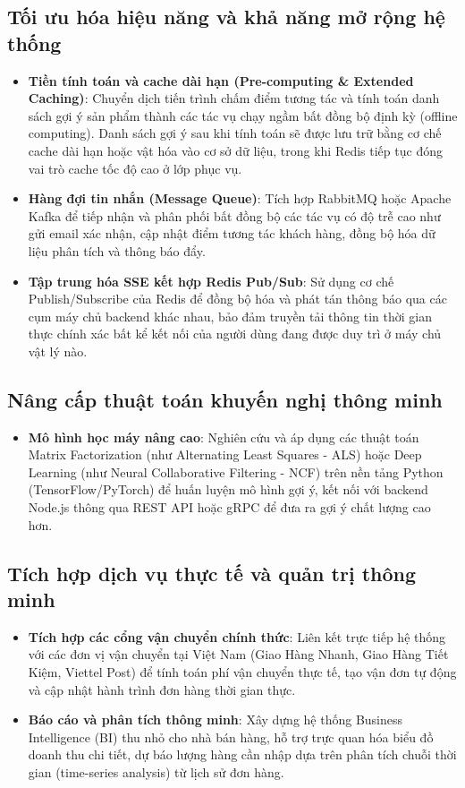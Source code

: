 \documentclass[../DoAn.tex]{subfiles}
\begin{document}
\subsection{Tối ưu hóa hiệu năng và khả năng mở rộng hệ thống}
\begin{itemize}
    \item \textbf{Tiền tính toán và cache dài hạn (Pre-computing \& Extended Caching)}: Chuyển dịch tiến trình chấm điểm tương tác và tính toán danh sách gợi ý sản phẩm thành các tác vụ chạy ngầm bất đồng bộ định kỳ (offline computing). Danh sách gợi ý sau khi tính toán sẽ được lưu trữ bằng cơ chế cache dài hạn hoặc vật hóa vào cơ sở dữ liệu, trong khi Redis tiếp tục đóng vai trò cache tốc độ cao ở lớp phục vụ.
    \item \textbf{Hàng đợi tin nhắn (Message Queue)}: Tích hợp RabbitMQ hoặc Apache Kafka để tiếp nhận và phân phối bất đồng bộ các tác vụ có độ trễ cao như gửi email xác nhận, cập nhật điểm tương tác khách hàng, đồng bộ hóa dữ liệu phân tích và thông báo đẩy.
    \item \textbf{Tập trung hóa SSE kết hợp Redis Pub/Sub}: Sử dụng cơ chế Publish/Subscribe của Redis để đồng bộ hóa và phát tán thông báo qua các cụm máy chủ backend khác nhau, bảo đảm truyền tải thông tin thời gian thực chính xác bất kể kết nối của người dùng đang được duy trì ở máy chủ vật lý nào.
\end{itemize}

\subsection{Nâng cấp thuật toán khuyến nghị thông minh}
\begin{itemize}
    \item \textbf{Mô hình học máy nâng cao}: Nghiên cứu và áp dụng các thuật toán Matrix Factorization (như Alternating Least Squares - ALS) hoặc Deep Learning (như Neural Collaborative Filtering - NCF) trên nền tảng Python (TensorFlow/PyTorch) để huấn luyện mô hình gợi ý, kết nối với backend Node.js thông qua REST API hoặc gRPC để đưa ra gợi ý chất lượng cao hơn.
\end{itemize}

\subsection{Tích hợp dịch vụ thực tế và quản trị thông minh}
\begin{itemize}
    \item \textbf{Tích hợp các cổng vận chuyển chính thức}: Liên kết trực tiếp hệ thống với các đơn vị vận chuyển tại Việt Nam (Giao Hàng Nhanh, Giao Hàng Tiết Kiệm, Viettel Post) để tính toán phí vận chuyển thực tế, tạo vận đơn tự động và cập nhật hành trình đơn hàng thời gian thực.
    \item \textbf{Báo cáo và phân tích thông minh}: Xây dựng hệ thống Business Intelligence (BI) thu nhỏ cho nhà bán hàng, hỗ trợ trực quan hóa biểu đồ doanh thu chi tiết, dự báo lượng hàng cần nhập dựa trên phân tích chuỗi thời gian (time-series analysis) từ lịch sử đơn hàng.
\end{itemize}
\end{document}
